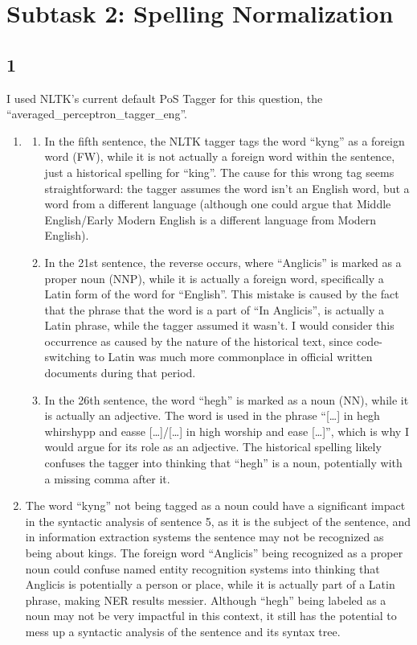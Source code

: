 \documentclass{article}
\begin{document}
\section{Subtask 2: Spelling Normalization}
\subsection{1}
I used NLTK's current default PoS Tagger for this question, the ``averaged\_perceptron\_tagger\_eng''.
\begin{enumerate}
    \item \begin{enumerate}
        \item In the fifth sentence, the NLTK tagger tags the word ``kyng'' as a foreign word (FW), while it is not actually a foreign word within the sentence, just a historical spelling for ``king''. The cause for this wrong tag seems straightforward: the tagger assumes the word isn't an English word, but a word from a different language (although one could argue that Middle English/Early Modern English is a different language from Modern English).
        \item In the 21st sentence, the reverse occurs, where ``Anglicis'' is marked as a proper noun (NNP), while it is actually a foreign word, specifically a Latin form of the word for ``English''. This mistake is caused by the fact that the phrase that the word is a part of ``In Anglicis'', is actually a Latin phrase, while the tagger assumed it wasn't. I would consider this occurrence as caused by the nature of the historical text, since code-switching to Latin was much more commonplace in official written documents during that period.
        \item In the 26th sentence, the word ``hegh'' is marked as a noun (NN), while it is actually an adjective. The word is used in the phrase ``[\dots] in hegh whirshypp and easse [\dots]/[\dots] in high worship and ease [\dots]'', which is why I would argue for its role as an adjective. The historical spelling likely confuses the tagger into thinking that ``hegh'' is a noun, potentially with a missing comma after it.
    \end{enumerate}
    \item The word ``kyng'' not being tagged as a noun could have a significant impact in the syntactic analysis of sentence 5, as it is the subject of the sentence, and in information extraction systems the sentence may not be recognized as being about kings. The foreign word ``Anglicis'' being recognized as a proper noun could confuse named entity recognition systems into thinking that Anglicis is potentially a person or place, while it is actually part of a Latin phrase, making NER results messier. Although ``hegh'' being labeled as a noun may not be very impactful in this context, it still has the potential to mess up a syntactic analysis of the sentence and its syntax tree.
\end{enumerate}
\end{document}

